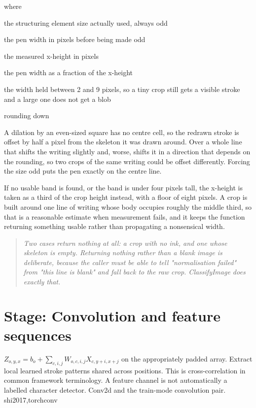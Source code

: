 \noindent where
\begin{description}[leftmargin=2.4em,style=nextline,font=\normalfont\ttfamily]\setlength\itemsep{1pt}
  \item[{$k$}] \normalfont the structuring element size actually used, always odd
  \item[{$w$}] \normalfont the pen width in pixels before being made odd
  \item[{$\mathrm{xh}$}] \normalfont the measured x-height in pixels
  \item[{$0.14$}] \normalfont the pen width as a fraction of the x-height
  \item[{$\mathrm{clip}(\cdot,2,9)$}] \normalfont the width held between 2 and 9 pixels, so a tiny crop still gets a visible stroke and a large one does not get a blob
  \item[{$\lfloor \cdot \rfloor$}] \normalfont rounding down
\end{description}
A dilation by an even-sized square has no centre cell, so the redrawn stroke is offset by half a pixel from the skeleton it was drawn around. Over a whole line that shifts the writing slightly and, worse, shifts it in a direction that depends on the rounding, so two crops of the same writing could be offset differently. Forcing the size odd puts the pen exactly on the centre line.


If no usable band is found, or the band is under four pixels tall, the x-height is taken as a third of the crop height instead, with a floor of eight pixels. A crop is built around one line of writing whose body occupies roughly the middle third, so that is a reasonable estimate when measurement fails, and it keeps the function returning something usable rather than propagating a nonsensical width.


\begin{quote}\small\itshape Two cases return nothing at all: a crop with no ink, and one whose skeleton is empty. Returning nothing rather than a blank image is deliberate, because the caller must be able to tell "normalisation failed" from "this line is blank" and fall back to the raw crop. ClassifyImage does exactly that.\end{quote}


\section*{Stage: Convolution and feature sequences}
{$Z_{o,y,x}=b_o+\sum_{c,i,j}W_{o,c,i,j}X_{c,y+i,x+j}$ on the appropriately padded array.}
{Extract local learned stroke patterns shared across positions. This is
cross-correlation in common framework terminology. A feature channel is not
automatically a labelled character detector.}
{Conv2d and the train-mode convolution pair.}
{shi2017,torchconv}

